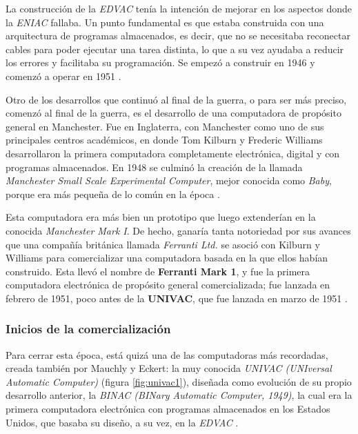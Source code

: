\documentclass[letterpaper,12pt,oneside]{book}
\begin{document}
        La construcción de la \textit{EDVAC} tenía la intención de mejorar en los aspectos donde la \textit{ENIAC} fallaba.
		Un punto fundamental es que estaba construida con una arquitectura de programas almacenados, es decir, que no se necesitaba reconectar 
		cables para
		poder ejecutar una tarea distinta, lo que a su vez ayudaba a reducir los errores y facilitaba su programación. Se empezó a construir en 1946 y comenzó a operar en 
		1951 \cite[p. 45]{oregan_brief_2012}.
		
		Otro de los desarrollos que continuó al final de la guerra, o para ser más preciso, comenzó al final de la guerra, es el desarrollo de una computadora
		de propósito general en Manchester. Fue en Inglaterra, con Manchester como uno de sus principales centros
		académicos, en donde Tom Kilburn y Frederic Williams desarrollaron la primera computadora completamente electrónica, digital y con programas almacenados.
		En 1948 se culminó la creación de la llamada \textit{Manchester Small Scale Experimental Computer}, mejor conocida como \textit{Baby},
		porque era más pequeña de lo común en la época \cite{oregan_brief_2012}.
        
        Esta computadora era más bien un prototipo que luego extenderían en la conocida \textit{Manchester Mark I}. De hecho,
		ganaría tanta notoriedad por sus avances que una compañía británica
		llamada \textit{Ferranti Ltd.} se asoció con Kilburn y Williams para comercializar una computadora basada en la que ellos habían construido.
		Esta llevó el nombre  de \textbf{Ferranti Mark 1}, y fue la primera computadora electrónica de propósito general comercializada; fue lanzada
		en febrero de 1951, poco antes de la \textbf{UNIVAC}, que fue lanzada en marzo de 1951 \cite[p. 36]{oregan_brief_2012}.
		


        \subsubsection{Inicios de la comercialización}
		
		Para cerrar esta época, está quizá una de las computadoras más recordadas, creada también por Mauchly y Eckert: la muy conocida	
		\textit{UNIVAC (UNIversal Automatic Computer)} (figura \ref{fig:univac1}), diseñada como evolución de su propio desarrollo  anterior, la
		\textit{BINAC (BINary Automatic Computer, 1949)}, la cual era la primera computadora electrónica con programas almacenados en los Estados Unidos, que basaba su diseño,
		a su vez, en la \textit{EDVAC} \cite{oregan_brief_2012}.
  
\end{document}
